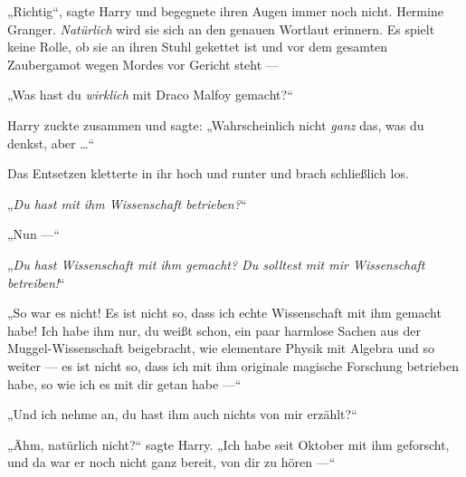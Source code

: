 „Richtig“, sagte Harry und begegnete ihren Augen immer noch nicht. Hermine Granger. \emph{Natürlich} wird sie sich an den genauen Wortlaut erinnern. Es spielt keine Rolle, ob sie an ihren Stuhl gekettet ist und vor dem gesamten Zaubergamot wegen Mordes vor Gericht steht —

„Was hast du \emph{wirklich} mit Draco Malfoy gemacht?“

Harry zuckte zusammen und sagte:
„Wahrscheinlich nicht \emph{ganz} das, was du denkst, aber …“

Das Entsetzen kletterte in ihr hoch und runter und brach schließlich los.

„\emph{Du hast mit ihm \emph{Wissenschaft} betrieben?}“

„Nun —“

„\emph{Du hast \emph{Wissenschaft} mit ihm gemacht? Du solltest mit \emph{mir} Wissenschaft betreiben!}“

„So war es nicht! Es ist nicht so, dass ich echte Wissenschaft mit ihm gemacht habe! Ich habe ihm nur, du weißt schon, ein paar harmlose Sachen aus der Muggel-Wissenschaft beigebracht, wie elementare Physik mit Algebra und so weiter — es ist nicht so, dass ich mit ihm originale magische Forschung betrieben habe, so wie ich es mit dir getan habe —“

„Und ich nehme an, du hast ihm auch nichts von mir erzählt?“

„Ähm, natürlich nicht?“ sagte Harry.
„Ich habe seit Oktober mit ihm geforscht, und da war er noch nicht ganz bereit, von dir zu hören —“

